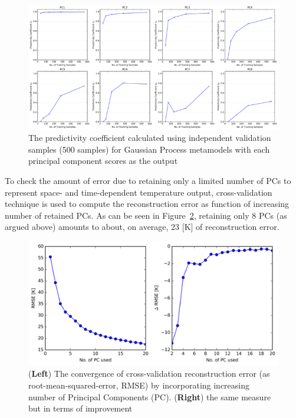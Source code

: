 \documentclass[11pt,titlepage]{article}
\begin{document}
\begin{figure}[h!]
	\centering
	\includegraphics[scale=0.95]{figures/gp_pc_conv.png}
	\caption{The predictivity coefficient calculated using independent 
		validation samples (500 samples) for Gaussian Process metamodels 
		with each principal component scores as the output}
	\label{fig:gp_pc_conv}
\end{figure}

To check the amount of error due to retaining only a limited number of PCs to 
represent space- and time-dependent temperature output, cross-validation 
technique \cite{Bro2009} is used to compute the reconstruction error as function of 
increasing number of retained PCs. As can be seen in Figure~\ref{fig:rmse}, retaining only 
8 PCs (as argued above) amounts to about, on average, 23 [K] of reconstruction 
error.

\begin{figure}[h!]
	\centering
	\includegraphics[scale=0.95]{figures/rmse.png}
	\caption{(\textbf{Left}) The convergence of cross-validation reconstruction
		 error (as root-mean-squared-error, RMSE) by incorporating increasing 
		 number of Principal Components (PC). (\textbf{Right}) the same 
		 measure but in terms of improvement}
	\label{fig:rmse}
\end{figure}
\end{document}

